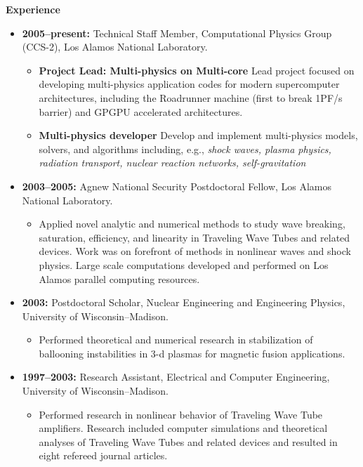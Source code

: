 \documentclass[12pt]{article}
\begin{document}
\noindent\textbf{Experience}
\begin{itemize}
\item {\bf 2005--present:} Technical Staff Member, Computational Physics
  Group (CCS-2), Los Alamos National Laboratory.
  \begin{itemize}
  \item \textbf{Project Lead: Multi-physics on Multi-core}
    Lead project focused on developing multi-physics
    application codes for modern supercomputer architectures,
    including the Roadrunner machine (first to break 1PF/s barrier)
    and GPGPU accelerated architectures.
  \item \textbf{Multi-physics developer} Develop and implement
    multi-physics models, solvers, and algorithms including, e.g.,
    \emph{shock waves, plasma physics, radiation transport, nuclear
      reaction networks, self-gravitation} 
  \end{itemize}
\item {\bf 2003--2005:} Agnew National Security Postdoctoral Fellow,
  Los Alamos National Laboratory.
  \begin{itemize}
  \item Applied novel analytic and numerical methods to study wave
  breaking, saturation,
  efficiency, and linearity in Traveling Wave Tubes and related
  devices. Work was on forefront of methods in nonlinear
  waves and shock physics.
  Large scale computations developed and
  performed on Los Alamos parallel computing resources.
  \end{itemize}
\item {\bf 2003:} Postdoctoral Scholar, Nuclear Engineering and Engineering
  Physics, University of Wisconsin--Madison.
  \begin{itemize}
  \item Performed theoretical and numerical research in stabilization
  of ballooning instabilities in 3-d plasmas for magnetic fusion
  applications.
  \end{itemize}
\item {\bf 1997--2003:} Research Assistant, Electrical and Computer
  Engineering, University of Wisconsin--Madison.
  \begin{itemize}
  \item Performed research in nonlinear behavior of Traveling Wave Tube
  amplifiers. Research included computer simulations and theoretical
  analyses of Traveling Wave Tubes and related devices and resulted in
  eight refereed journal articles.
  \end{itemize}

\end{itemize}
\end{document}
